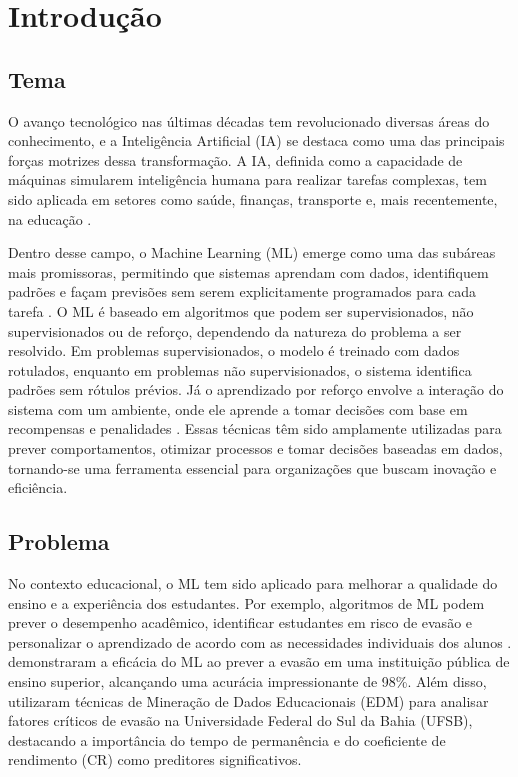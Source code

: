 \documentclass[12pt]{article}
\begin{document}
\section{Introdução}

\subsection{Tema}
O avanço tecnológico nas últimas décadas tem revolucionado diversas áreas do conhecimento, e a Inteligência Artificial (IA) se destaca como uma das principais forças motrizes dessa transformação. A IA, definida como a capacidade de máquinas simularem inteligência humana para realizar tarefas complexas, tem sido aplicada em setores como saúde, finanças, transporte e, mais recentemente, na educação \cite{RussellNorvig2016}.

Dentro desse campo, o Machine Learning (ML) emerge como uma das subáreas mais promissoras, permitindo que sistemas aprendam com dados, identifiquem padrões e façam previsões sem serem explicitamente programados para cada tarefa \cite{Mitchell1997}. O ML é baseado em algoritmos que podem ser supervisionados, não supervisionados ou de reforço, dependendo da natureza do problema a ser resolvido. Em problemas supervisionados, o modelo é treinado com dados rotulados, enquanto em problemas não supervisionados, o sistema identifica padrões sem rótulos prévios. Já o aprendizado por reforço envolve a interação do sistema com um ambiente, onde ele aprende a tomar decisões com base em recompensas e penalidades \cite{Goodfellow2016}. Essas técnicas têm sido amplamente utilizadas para prever comportamentos, otimizar processos e tomar decisões baseadas em dados, tornando-se uma ferramenta essencial para organizações que buscam inovação e eficiência.

\subsection{Problema}
No contexto educacional, o ML tem sido aplicado para melhorar a qualidade do ensino e a experiência dos estudantes. Por exemplo, algoritmos de ML podem prever o desempenho acadêmico, identificar estudantes em risco de evasão e personalizar o aprendizado de acordo com as necessidades individuais dos alunos \cite{FilhoVinutoLeal2020}. \cite{Kantorski2016} demonstraram a eficácia do ML ao prever a evasão em uma instituição pública de ensino superior, alcançando uma acurácia impressionante de 98\%. Além disso, \cite{Bastos2024} utilizaram técnicas de Mineração de Dados Educacionais (EDM) para analisar fatores críticos de evasão na Universidade Federal do Sul da Bahia (UFSB), destacando a importância do tempo de permanência e do coeficiente de rendimento (CR) como preditores significativos.
\end{document}
